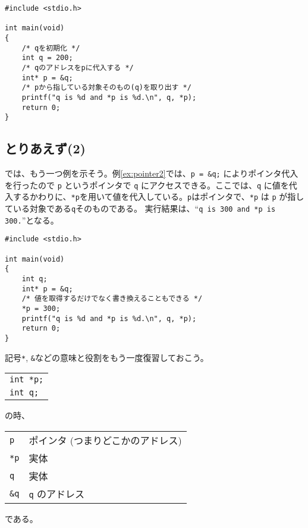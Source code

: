 \begin{reidai}\label{ex:pointer1}
    \begin{verbatim}
#include <stdio.h>

int main(void)
{
    /* qを初期化 */
    int q = 200;
    /* qのアドレスをpに代入する */
    int* p = &q;
    /* pから指している対象そのもの(q)を取り出す */
    printf("q is %d and *p is %d.\n", q, *p);
    return 0;
}
\end{verbatim}
\end{reidai}
\begin{figure}[H]
    \centering
\end{figure}

\subsection{とりあえず(2)}
では、もう一つ例を示そう。例\ref{ex:pointer2}では、\texttt{p = \&q;} によりポインタ代入を行ったので \texttt{p} というポインタで \texttt{q} にアクセスできる。ここでは、\texttt{q} に値を代入するかわりに、\texttt{*p}を用いて値を代入している。\texttt{p}はポインタで、\texttt{*p} は \texttt{p} が指している対象である\texttt{q}そのものである。
実行結果は、``\texttt{q is 300 and *p is 300.}''となる。
\begin{reidai}\label{ex:pointer2}
    \begin{verbatim}
#include <stdio.h>

int main(void)
{
    int q;
    int* p = &q;
    /* 値を取得するだけでなく書き換えることもできる */
    *p = 300;
    printf("q is %d and *p is %d.\n", q, *p);
    return 0;
}
\end{verbatim}
\end{reidai} \noindent
記号\texttt{*}, \texttt{\&}などの意味と役割をもう一度復習しておこう。
\begin{table}[H]
    \centering
    \begin{tabular}{l}
        \texttt{int *p;} \\
        \texttt{int q;}
    \end{tabular}
\end{table} \noindent
の時、
\begin{table}[H]
    \centering
    \begin{tabular}{ll}
        \texttt{p}   & ポインタ (つまりどこかのアドレス) \\
        \texttt{*p}  & 実体                              \\
        \texttt{q}   & 実体                              \\
        \texttt{\&q} & \texttt{q} のアドレス
    \end{tabular}
\end{table} \noindent
である。

